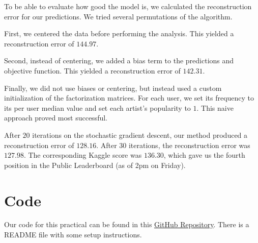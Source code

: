 \documentclass[10pt]{article}
\begin{document}
To be able to evaluate how good the model is, we calculated the reconstruction error for our predictions. We tried several permutations of the algorithm. 

First, we centered the data before performing the analysis. This yielded a reconstruction error of $144.97$. 

Second, instead of centering, we added a bias term to the predictions and objective function. This yielded a reconstruction error of $142.31$. 

Finally, we did not use biases or centering, but instead used a custom initialization of the factorization matrices. For each user, we set its frequency to its per user median value and set each artist's popularity to $1$. This naive approach proved most successful. 

After $20$ iterations on the stochastic gradient descent, our method produced a reconstruction error of $128.16$. After $30$ iterations, the reconstruction error was $127.98$. The corresponding Kaggle score was $136.30$, which gave us the fourth position in the Public Leaderboard (as of 2pm on Friday). 

\section{Code}

Our code for this practical can be found in this \href{https://github.com/victordomene/cs181-practicals/tree/master/practical3}{GitHub Repository}. There is a README file with some setup instructions.
\end{document}
